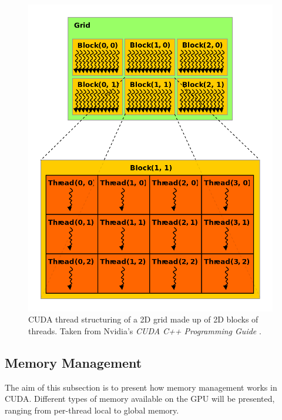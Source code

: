 \begin{figure}[h!]
	\centering
	\includegraphics[width=11cm, keepaspectratio]{images/ch1/nvidia_grid_block_thread.png}
	\caption{CUDA thread structuring of a 2D grid made up of 2D blocks of threads. Taken from Nvidia's \emph{CUDA C++ Programming Guide} \cite{NVIDIAMay2022}.}
	\label{Figure:CUDA-grid-block-thread}
\end{figure}


\subsection{Memory Management \TO}\label{Subsection:memory-management}
The aim of this subsection is to present how memory management works in CUDA. Different types of memory available on the GPU will be presented, ranging from per-thread local to global memory.

